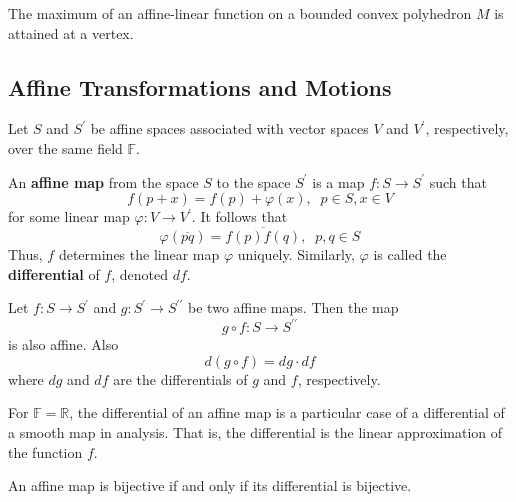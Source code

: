   \begin{theorem}
    The maximum of an affine-linear function on a bounded convex polyhedron $M$ is attained at a vertex. 
  \end{theorem}

\subsection{Affine Transformations and Motions}

  Let $S$ and $S^\prime$ be affine spaces associated with vector spaces $V$ and $V^\prime$, respectively, over the same field $\mathbb{F}$. 

  \begin{definition}
    An \textbf{affine map} from the space $S$ to the space $S^\prime$ is a map $f: S \longrightarrow S^\prime$ such that
    \begin{equation}
      f(p+x) = f(p) + \varphi(x), \;\; p \in S, x \in V
    \end{equation}
    for some linear map $\varphi: V \longrightarrow V^\prime$. It follows that
    \begin{equation}
      \varphi(\overline{pq}) = \overline{f(p) f(q)}, \;\; p, q \in S
    \end{equation}
    Thus, $f$ determines the linear map $\varphi$ uniquely. Similarly, $\varphi$ is called the \textbf{differential} of $f$, denoted $df$. 
  \end{definition}

  \begin{proposition}
    Let $f: S \longrightarrow S^\prime$ and $g: S^\prime \longrightarrow S^{\prime \prime}$ be two affine maps. Then the map
    \begin{equation}
      g \circ f : S \longrightarrow S^{\prime\prime}
    \end{equation}
    is also affine. Also
    \begin{equation}
      d(g \circ f) = dg \cdot df
    \end{equation}
    where $dg$ and $df$ are the differentials of $g$ and $f$, respectively. 
  \end{proposition}

  For $\mathbb{F} = \mathbb{R}$, the differential of an affine map is a particular case of a differential of a smooth map in analysis. That is, the differential is the linear approximation of the function $f$. 

  \begin{proposition}
    An affine map is bijective if and only if its differential is bijective. 
  \end{proposition}

